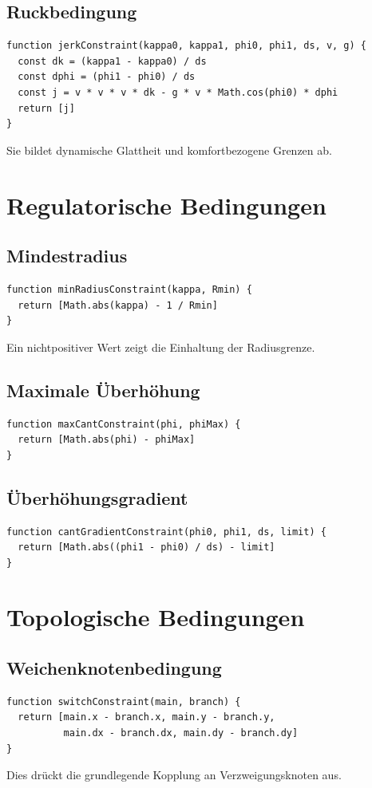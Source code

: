 \subsection{Ruckbedingung}
\begin{verbatim}
function jerkConstraint(kappa0, kappa1, phi0, phi1, ds, v, g) {
  const dk = (kappa1 - kappa0) / ds
  const dphi = (phi1 - phi0) / ds
  const j = v * v * v * dk - g * v * Math.cos(phi0) * dphi
  return [j]
}
\end{verbatim}
Sie bildet dynamische Glattheit und komfortbezogene Grenzen ab.

\section{Regulatorische Bedingungen}
\subsection{Mindestradius}
\begin{verbatim}
function minRadiusConstraint(kappa, Rmin) {
  return [Math.abs(kappa) - 1 / Rmin]
}
\end{verbatim}
Ein nichtpositiver Wert zeigt die Einhaltung der Radiusgrenze.

\subsection{Maximale Überhöhung}
\begin{verbatim}
function maxCantConstraint(phi, phiMax) {
  return [Math.abs(phi) - phiMax]
}
\end{verbatim}

\subsection{Überhöhungsgradient}
\begin{verbatim}
function cantGradientConstraint(phi0, phi1, ds, limit) {
  return [Math.abs((phi1 - phi0) / ds) - limit]
}
\end{verbatim}

\section{Topologische Bedingungen}
\subsection{Weichenknotenbedingung}
\begin{verbatim}
function switchConstraint(main, branch) {
  return [main.x - branch.x, main.y - branch.y,
          main.dx - branch.dx, main.dy - branch.dy]
}
\end{verbatim}
Dies drückt die grundlegende Kopplung an Verzweigungsknoten aus.

